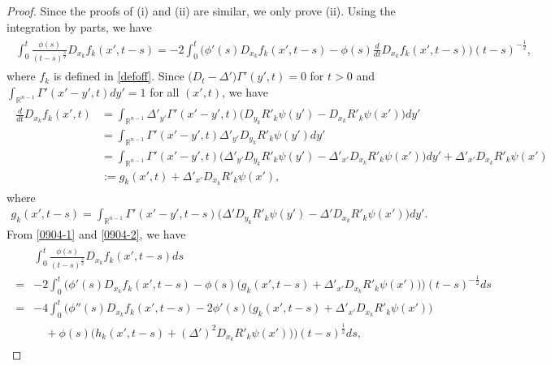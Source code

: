 \documentclass[10pt,a4paper]{amsart}
\newcommand{\De}{\Delta}
\newcommand{\Ga}{\Gamma}
\newcommand{\Rn}{{\mathbb R}^{n-1}}
\begin{document}
 \begin{proof}
Since the proofs of (i) and (ii) are similar, we only prove (ii). Using the integration by parts, we have 
\begin{align}\label{0904-1}
\begin{split}
\int_0^t   \frac{\phi(s)}{(t-s)^\frac32}     D_{x_k}  f_k (x', t-s) 
=  -  2\int_0^t    \Big(  \phi' (s)      D_{x_k}  f _k (x', t-s)  -  \phi (s)      \frac{d}{dt} D_{x_k}  f _k (x', t-s)  \Big)  (t-s)^{-\frac12} ,
\end{split}
\end{align}
where $f_k$ is defined in \eqref{defoff}. 
Since $ \big( D_t -\De' \big) \Ga'(y', t) =0$ for $ t> 0$ and   $\int_{\Rn} \Ga' (x' - y', t) dy' =1$ for all  $(x', t)$, we have
\begin{align}\label{0904-2}
\begin{split}
\frac{d}{dt}  D_{x_k}  f _k ( x', t)  &  =\int_{\Rn} \De'_{y'} \Ga' (x'-y', t) \Big( D_{y_k} R'_k \psi(y')  - D_{x_k} R'_k \psi(x') \Big) dy'\\  
&  =\int_{\Rn}  \Ga' (x'-y', t)  \De'_{y '} D_{y_k} R'_k \psi(y')  dy'\\ 
&  =\int_{\Rn}   \Ga' (x'-y', t) \Big(  \De'_{y'} D_{y_k}   R'_k\psi(y')  -  \De'_{x'} D_{x_k} R'_k \psi(x') \Big) dy' + \De'_{x'} D_{x_k} R'_k \psi(x')\\
& := g_k(x', t) +   \De'_{x'} D_{x_k} R'_k \psi(x'),
\end{split}
\end{align}
where 
\begin{align*}
g_k (x', t-s)  = \int_{\Rn} \Ga' (x'- y', t-s) \Big(  \De'  D_{y_k} R'_k \psi(y') -   \De' D_{x_k}  R'_k \psi(x') \Big) dy'.
\end{align*} 
From \eqref{0904-1} and \eqref{0904-2},  we have 
\begin{align*}%
\begin{split}
&\int_0^t   \frac{\phi(s)}{(t-s)^\frac32}  D_{x_k}  f _k (x', t-s) ds\\
 =& -  2\int_0^t    \Big(  \phi' (s)    D_{x_k}  f _k (x', t-s)  -  \phi (s)   \big(g_k (x', t-s) +   \De'_{x'} D_{x_k} R'_k \psi(x')    \big)  \Big)  (t-s)^{-\frac12}   ds\\
=& - 4\int_0^t    \Big(  \phi'' (s)    D_{x_k}  f _k(x', t-s)  -  2\phi'  (s)   \Big(g_k (x', t-s) +   \De'_{x'} D_{x_k} R'_k \psi(x') \Big) \\
& \quad    + \phi (s) \big(h_k (x', t-s)   + ( \De')^2 D_{x_k}  R'_k \psi(x')   \big) \Big)  (t-s)^{\frac12}   ds,
\end{split}
\end{align*}




\end{proof}
\end{document}
